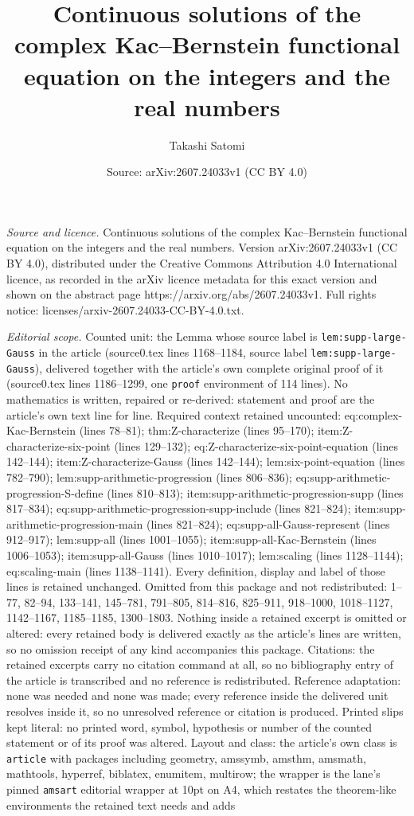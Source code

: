\documentclass[10pt,a4paper]{amsart}
\title[Continuous solutions of the complex Kac--Bernstein functiona]{Continuous solutions of the complex Kac--Bernstein functional equation on the integers and the real numbers}
\author{Takashi Satomi}
\date{Source: arXiv:2607.24033v1 (CC BY 4.0)}
\begin{document}
\maketitle

\noindent\emph{Source and licence.} Continuous solutions of the complex Kac--Bernstein functional equation on the integers and the real numbers. Version arXiv:2607.24033v1 (CC BY 4.0), distributed under the Creative Commons Attribution 4.0 International licence, as recorded in the arXiv licence metadata for this exact version and shown on the abstract page https://arxiv.org/abs/2607.24033v1. Full rights notice: licenses/arxiv-2607.24033-CC-BY-4.0.txt.\par\smallskip

\noindent\textit{Editorial scope.} Counted unit: the Lemma whose source label is \texttt{lem:supp-large-Gauss} in the article (source0.tex lines 1168--1184, source label \texttt{lem:supp-large-Gauss}), delivered together with the article's own complete original proof of it (source0.tex lines 1186--1299, one \texttt{proof} environment of 114 lines). No mathematics is written, repaired or re-derived: statement and proof are the article's own text line for line. Required context retained uncounted: eq:complex-Kac-Bernstein (lines 78--81); thm:Z-characterize (lines 95--170); item:Z-characterize-six-point (lines 129--132); eq:Z-characterize-six-point-equation (lines 142--144); item:Z-characterize-Gauss (lines 142--144); lem:six-point-equation (lines 782--790); lem:supp-arithmetic-progression (lines 806--836); eq:supp-arithmetic-progression-S-define (lines 810--813); item:supp-arithmetic-progression-supp (lines 817--834); eq:supp-arithmetic-progression-supp-include (lines 821--824); item:supp-arithmetic-progression-main (lines 821--824); eq:supp-all-Gauss-represent (lines 912--917); lem:supp-all (lines 1001--1055); item:supp-all-Kac-Bernstein (lines 1006--1053); item:supp-all-Gauss (lines 1010--1017); lem:scaling (lines 1128--1144); eq:scaling-main (lines 1138--1141). Every definition, display and label of those lines is retained unchanged. Omitted from this package and not redistributed: 1--77, 82--94, 133--141, 145--781, 791--805, 814--816, 825--911, 918--1000, 1018--1127, 1142--1167, 1185--1185, 1300--1803. Nothing inside a retained excerpt is omitted or altered: every retained body is delivered exactly as the article's lines are written, so no omission receipt of any kind accompanies this package. Citations: the retained excerpts carry no citation command at all, so no bibliography entry of the article is transcribed and no reference is redistributed. Reference adaptation: none was needed and none was made; every reference inside the delivered unit resolves inside it, so no unresolved reference or citation is produced. Printed slips kept literal: no printed word, symbol, hypothesis or number of the counted statement or of its proof was altered. Layout and class: the article's own class is \texttt{article} with packages including geometry, amssymb, amsthm, amsmath, mathtools, hyperref, biblatex, enumitem, multirow; the wrapper is the lane's pinned \texttt{amsart} editorial wrapper at 10pt on A4, which restates the theorem-like environments the retained text needs and adds 
\end{document}
